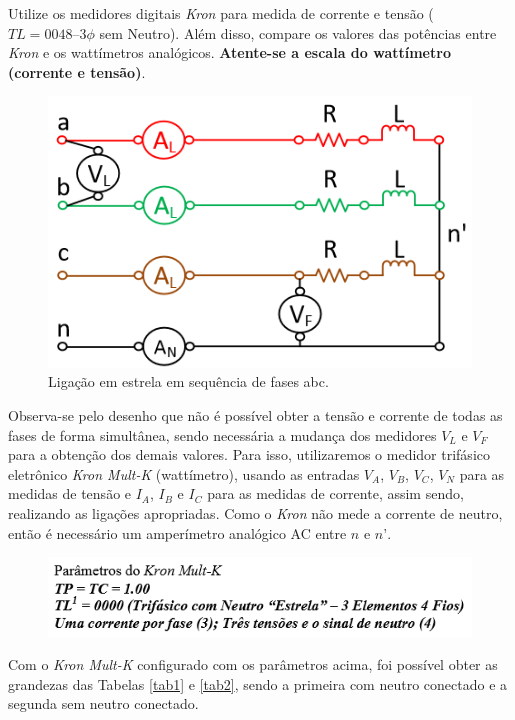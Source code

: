 \documentclass[a4paper,12pt,oneside,openany,table,xcdraw]{article}
\begin{document}
Utilize os medidores digitais \emph{Kron} para medida de corrente e tensão ($TL = 0048 – 3\phi$ sem Neutro). Além disso, compare os valores das potências entre \emph{Kron} e os wattímetros analógicos. \textbf{Atente-se a escala do wattímetro (corrente e tensão)}. 
\begin{figure}[H]
\centering
\captionsetup{font=scriptsize}
\includegraphics[width=14cm]{fig1}
\caption{Ligação em estrela em sequência de fases abc.}
\label{fig1}
\end{figure}
Observa-se pelo desenho que não é possível obter a tensão e corrente de todas as fases de forma simultânea, sendo necessária a mudança dos medidores $V_L$ e $V_F$ para a obtenção dos demais valores. Para isso, utilizaremos o medidor trifásico eletrônico \textit{Kron Mult-K} (wattímetro),  usando as entradas $V_A$, $V_B$, $V_C$, $V_N$ para as medidas de tensão e $I_A$, $I_B$ e $I_C$ para as medidas de corrente, assim sendo, realizando as ligações apropriadas. Como o \textit{Kron} não mede a corrente de neutro, então é necessário um amperímetro analógico AC entre $n$ e $n’$.

\begin{figure}[H]
\centering
\captionsetup{font=scriptsize}
\includegraphics[width=13.5cm]{parametros1}
\end{figure}

Com o \textit{Kron Mult-K} configurado com os parâmetros acima, foi possível obter as grandezas das Tabelas \ref{tab1} e \ref{tab2}, sendo a primeira com neutro conectado e a segunda sem neutro conectado.
\end{document}
